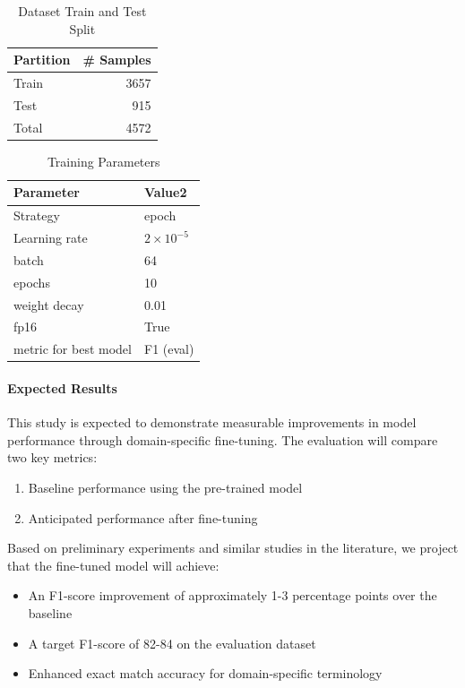 \documentclass[onecolumn, journal, english, 12pt, a4paper]{IEEEtran} %
\theoremstyle{definition}
\begin{document}
\begin{table}[htbp]
\caption{\label{tab:org06f9053}Dataset Train and Test Split}
\centering
\begin{tabular}{lr}
Partition & \# Samples\\
\hline
Train & 3657\\
Test & 915\\
Total & 4572\\
\end{tabular}
\end{table}


\begin{table}[htbp]
\caption{\label{tab:org4204959}Training Parameters}
\centering
\begin{tabular}{ll}
Parameter & Value2\\
\hline
Strategy & epoch\\
Learning rate & \(2 \times 10^{-5}\)\\
batch & 64\\
epochs & 10\\
weight decay & 0.01\\
fp16 & True\\
metric for best model & F1 (eval)\\
\end{tabular}
\end{table}

\paragraph{Expected Results}

This study is expected to demonstrate measurable improvements in model
performance through domain-specific fine-tuning. The evaluation will
compare two key metrics:

\begin{enumerate}
\item Baseline performance using the pre-trained model
\item Anticipated performance after
fine-tuning
\end{enumerate}

Based on preliminary experiments and similar studies in the
literature, we project that the fine-tuned model will achieve:

\begin{itemize}
\item An F1-score improvement of approximately 1-3 percentage points
  over the baseline
\item A target F1-score of 82-84 on the evaluation dataset
\item Enhanced exact match accuracy for domain-specific terminology
\end{itemize}
\end{document}
